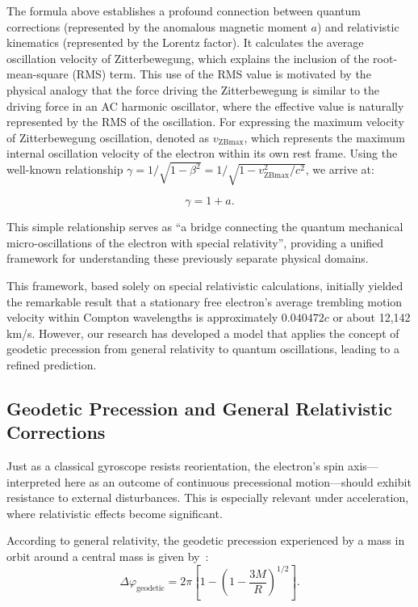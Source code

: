 \documentclass[%
 reprint,
 amsmath,amssymb,
 aps,
]{revtex4-1}
\numberwithin{equation}{section}%
\begin{document}
The formula above establishes a profound connection between quantum corrections (represented by the anomalous magnetic moment $a$) and relativistic kinematics (represented by the Lorentz factor). It calculates the average oscillation velocity of Zitterbewegung, which explains the inclusion of the root-mean-square (RMS) term. This use of the RMS value is motivated by the physical analogy that the force driving the Zitterbewegung is similar to the driving force in an AC harmonic oscillator, where the effective value is naturally represented by the RMS of the oscillation. For expressing the maximum velocity of Zitterbewegung oscillation, denoted as $v_{\mathrm{ZBmax}}$, which represents the maximum internal oscillation velocity of the electron within its own rest frame. Using the well-known relationship $\gamma = 1/\sqrt{1 - \beta^2} = 1/\sqrt{1 - v_{\mathrm{ZBmax}}^2/c^2}$, we arrive at:

\begin{equation}
\gamma = 1 + a .
\label{eq:gamma_anomalous}
\end{equation}

\vspace{0.3cm}


This simple relationship serves as ``a bridge connecting the quantum mechanical micro-oscillations of the electron with special relativity'', providing a unified framework for understanding these previously separate physical domains.

This framework, based solely on special relativistic calculations, initially yielded the remarkable result that a stationary free electron's average trembling motion velocity within Compton wavelengths is approximately $0.040472c$ or about 12,142 km/s. However, our research has developed a model that applies the concept of geodetic precession from general relativity to quantum oscillations, leading to a refined prediction.

\subsection{Geodetic Precession and General Relativistic Corrections}

Just as a classical gyroscope resists reorientation, the electron's spin axis—interpreted here as an outcome of continuous precessional motion—should exhibit resistance to external disturbances. This is especially relevant under acceleration, where relativistic effects become significant.

According to general relativity, the geodetic precession experienced by a mass in orbit around a central mass is given by~\cite{hartle2021}:
\begin{equation}
\Delta\varphi_{\text{geodetic}} = 2\pi \left[1 - \left(1 - \frac{3M}{R} \right)^{1/2} \right].
\label{eq:geodetic_precession}
\end{equation}
\end{document}
